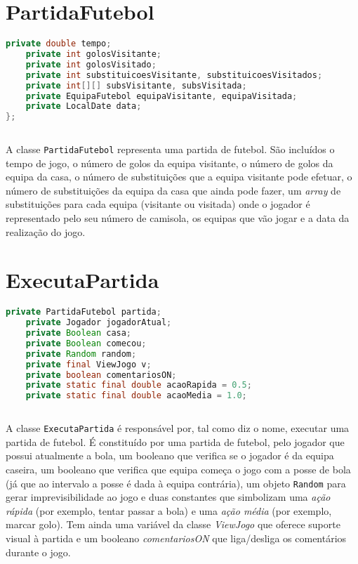 \documentclass[a4paper]{report}
\begin{document}
	
	
	\section{PartidaFutebol}
	\begin{lstlisting}[language=Java]
    private double tempo;
    private int golosVisitante;
    private int golosVisitado;
    private int substituicoesVisitante, substituicoesVisitados;
    private int[][] subsVisitante, subsVisitada;
    private EquipaFutebol equipaVisitante, equipaVisitada;
    private LocalDate data;
};
   
	\end{lstlisting}
    A classe \texttt{PartidaFutebol} representa uma partida de futebol. São incluídos o tempo de jogo, o número de golos da equipa visitante, o número de golos da equipa da casa, o número de substituições que a equipa visitante pode efetuar, o número de substituições da equipa da casa que ainda pode fazer, um \textit{array} de substituições para cada equipa (visitante ou visitada) onde o jogador é representado
    pelo seu número de camisola, os equipas que vão jogar e a data da realização do jogo.
	  
		\section{ExecutaPartida}
	\begin{lstlisting}[language=Java]
    private PartidaFutebol partida;
    private Jogador jogadorAtual;
    private Boolean casa; 
    private Boolean comecou;
    private Random random;
    private final ViewJogo v;
    private boolean comentariosON;
    private static final double acaoRapida = 0.5;
    private static final double acaoMedia = 1.0;
	
	\end{lstlisting}
		A classe \texttt{ExecutaPartida} é responsável por, tal como diz o nome, executar uma partida de futebol.
		É constituído por uma partida de futebol, pelo jogador que possui atualmente a bola, um booleano que verifica se o jogador é da equipa caseira, um booleano que verifica que equipa começa o jogo com a posse de bola (já que ao intervalo a posse é dada à equipa contrária), um objeto \texttt{Random} para gerar imprevisibilidade ao jogo e duas constantes que simbolizam uma \textit{ação rápida} (por exemplo, tentar passar a bola) e uma \textit{ação média} (por exemplo, marcar golo). Tem ainda uma variável da classe \textit{ViewJogo} que oferece suporte visual à partida e um booleano \textit{comentariosON} que liga/desliga os comentários durante o jogo.
\end{document}
